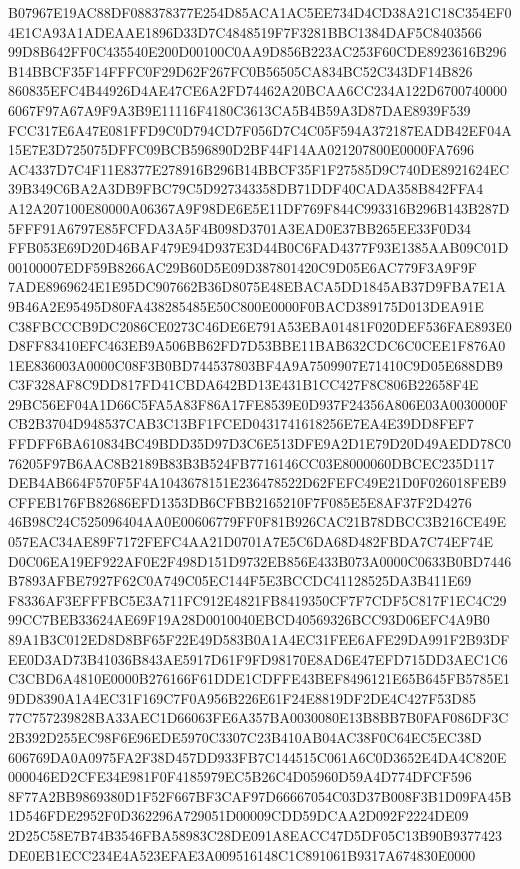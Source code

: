 \documentclass[UTF8,fontset=fandol,zihao=-4,a4paper]{ctexart}
\begin{document}
{{B07967E19AC88DF088378377E254D85ACA1AC5EE734D4CD38A21C18C354EF04E1CA93A1ADEAAE1896D33D7C4848519F7F3281BBC1384DAF5C8403566
99D8B642FF0C435540E200D00100C0AA9D856B223AC253F60CDE8923616B296B14BBCF35F14FFFC0F29D62F267FC0B56505CA834BC52C343DF14B826
860835EFC4B44926D4AE47CE6A2FD74462A20BCAA6CC234A122D67007400006067F97A67A9F9A3B9E11116F4180C3613CA5B4B59A3D87DAE8939F539
FCC317E6A47E081FFD9C0D794CD7F056D7C4C05F594A372187EADB42EF04A15E7E3D725075DFFC09BCB596890D2BF44F14AA021207800E0000FA7696
AC4337D7C4F11E8377E278916B296B14BBCF35F1F27585D9C740DE8921624EC39B349C6BA2A3DB9FBC79C5D927343358DB71DDF40CADA358B842FFA4
A12A207100E80000A06367A9F98DE6E5E11DF769F844C993316B296B143B287D5FFF91A6797E85FCFDA3A5F4B098D3701A3EAD0E37BB265EE33F0D34
FFB053E69D20D46BAF479E94D937E3D44B0C6FAD4377F93E1385AAB09C01D00100007EDF59B8266AC29B60D5E09D387801420C9D05E6AC779F3A9F9F
7ADE8969624E1E95DC907662B36D8075E48EBACA5DD1845AB37D9FBA7E1A9B46A2E95495D80FA438285485E50C800E0000F0BACD389175D013DEA91E
C38FBCCCB9DC2086CE0273C46DE6E791A53EBA01481F020DEF536FAE893E0D8FF83410EFC463EB9A506BB62FD7D53BBE11BAB632CDC6C0CEE1F876A0
1EE836003A0000C08F3B0BD744537803BF4A9A7509907E71410C9D05E688DB9C3F328AF8C9DD817FD41CBDA642BD13E431B1CC427F8C806B22658F4E
29BC56EF04A1D66C5FA5A83F86A17FE8539E0D937F24356A806E03A0030000FCB2B3704D948537CAB3C13BF1FCED0431741618256E7EA4E39DD8FEF7
FFDFF6BA610834BC49BDD35D97D3C6E513DFE9A2D1E79D20D49AEDD78C076205F97B6AAC8B2189B83B3B524FB7716146CC03E8000060DBCEC235D117
DEB4AB664F570F5F4A1043678151E236478522D62FEFC49E21D0F026018FEB9CFFEB176FB82686EFD1353DB6CFBB2165210F7F085E5E8AF37F2D4276
46B98C24C525096404AA0E00606779FF0F81B926CAC21B78DBCC3B216CE49E057EAC34AE89F7172FEFC4AA21D0701A7E5C6DA68D482FBDA7C74EF74E
D0C06EA19EF922AF0E2F498D151D9732EB856E433B073A0000C0633B0BD7446B7893AFBE7927F62C0A749C05EC144F5E3BCCDC41128525DA3B411E69
F8336AF3EFFFBC5E3A711FC912E4821FB8419350CF7F7CDF5C817F1EC4C2999CC7BEB33624AE69F19A28D0010040EBCD40569326BCC93D06EFC4A9B0
89A1B3C012ED8D8BF65F22E49D583B0A1A4EC31FEE6AFE29DA991F2B93DFEE0D3AD73B41036B843AE5917D61F9FD98170E8AD6E47EFD715DD3AEC1C6
C3CBD6A4810E0000B276166F61DDE1CDFFE43BEF8496121E65B645FB5785E19DD8390A1A4EC31F169C7F0A956B226E61F24E8819DF2DE4C427F53D85
77C757239828BA33AEC1D66063FE6A357BA0030080E13B8BB7B0FAF086DF3C2B392D255EC98F6E96EDE5970C3307C23B410AB04AC38F0C64EC5EC38D
606769DA0A0975FA2F38D457DD933FB7C144515C061A6C0D3652E4DA4C820E000046ED2CFE34E981F0F4185979EC5B26C4D05960D59A4D774DFCF596
8F77A2BB9869380D1F52F667BF3CAF97D66667054C03D37B008F3B1D09FA45B1D546FDE2952F0D362296A729051D00009CDD59DCAA2D092F2224DE09
2D25C58E7B74B3546FBA58983C28DE091A8EACC47D5DF05C13B90B9377423DE0EB1ECC234E4A523EFAE3A009516148C1C891061B9317A674830E0000
}}
\end{document}
